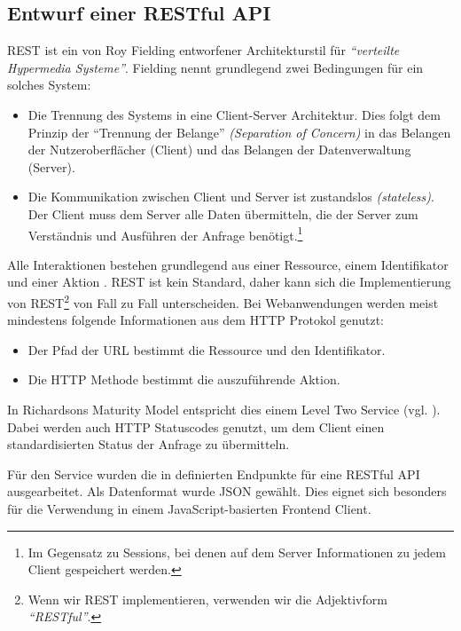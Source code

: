 \subsection{Entwurf einer RESTful API}

\ac{REST} ist ein von Roy Fielding entworfener Architekturstil für \emph{``verteilte Hypermedia Systeme''}. Fielding nennt grundlegend zwei Bedingungen für ein solches System:

\begin{itemize}
  \item Die Trennung des Systems in eine Client-Server Architektur. Dies folgt dem Prinzip der ``Trennung der Belange'' \emph{(Separation of Concern)} in das Belangen der Nutzeroberflächer (Client) und das Belangen der Datenverwaltung (Server).
  \item Die Kommunikation zwischen Client und Server ist zustandslos \emph{(stateless)}. Der Client muss dem Server alle Daten übermitteln, die der Server zum Verständnis und Ausführen der Anfrage benötigt.\footnote{Im Gegensatz zu Sessions, bei denen auf dem Server Informationen zu jedem Client gespeichert werden.}
\end{itemize}

Alle Interaktionen bestehen grundlegend aus einer Ressource, einem Identifikator und einer Aktion \citep[12]{Webber2010}. REST ist kein Standard, daher kann sich die Implementierung von REST\footnote{Wenn wir REST implementieren, verwenden wir die Adjektivform \emph{``RESTful''}.} von Fall zu Fall unterscheiden. Bei Webanwendungen werden meist mindestens folgende Informationen aus dem HTTP Protokol genutzt:

\begin{itemize}
  \item Der Pfad der URL bestimmt die Ressource und den Identifikator.
  \item Die HTTP Methode bestimmt die auszuführende Aktion.
\end{itemize}

In Richardsons Maturity Model entspricht dies einem Level Two Service (vgl. \citep[20]{Webber2010}). Dabei werden auch HTTP Statuscodes genutzt, um dem Client einen standardisierten Status der Anfrage zu übermitteln.

Für den Service wurden die in  definierten Endpunkte für eine RESTful API ausgearbeitet. Als Datenformat wurde JSON gewählt. Dies eignet sich besonders für die Verwendung in einem JavaScript-basierten Frontend Client.

